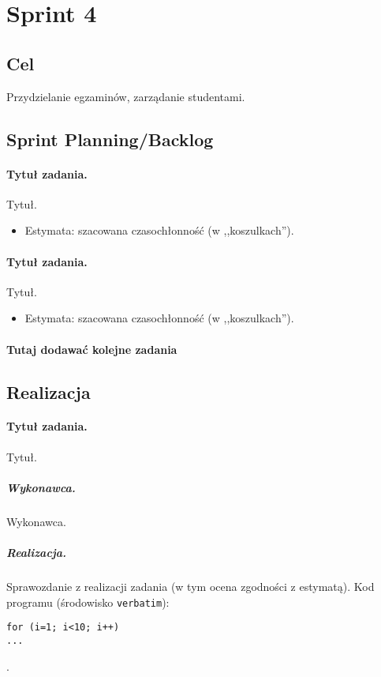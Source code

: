 \documentclass[a4paper]{article}
\begin{document}
\section{Sprint 4}

\subsection{Cel} Przydzielanie egzaminów, zarządanie studentami.

\subsection{Sprint Planning/Backlog}

\paragraph{Tytuł zadania.} Tytuł.
\begin{itemize}
\item Estymata: szacowana czasochłonność (w ,,koszulkach'').
\end{itemize}

\paragraph{Tytuł zadania.} Tytuł.
\begin{itemize}
\item Estymata: szacowana czasochłonność (w ,,koszulkach'').
\end{itemize}

\paragraph{Tutaj dodawać kolejne zadania}

\subsection{Realizacja}

\paragraph{Tytuł zadania.} Tytuł.
\subparagraph{Wykonawca.} Wykonawca.
\subparagraph{Realizacja.} Sprawozdanie z realizacji zadania (w tym ocena zgodności z estymatą). Kod programu (środowisko \texttt{verbatim}): \begin{verbatim}
for (i=1; i<10; i++)
...
\end{verbatim}.
\end{document}
